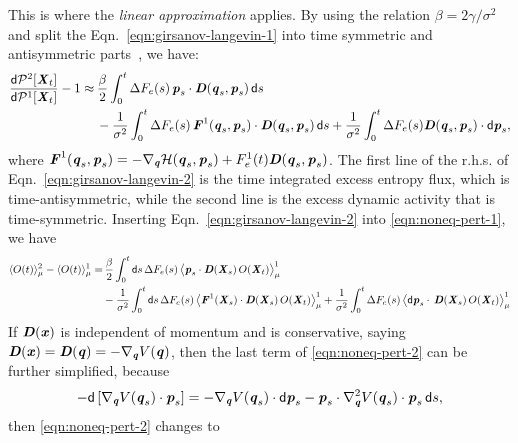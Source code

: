 \documentclass[aip,jcp,a4paper,reprint,onecolumn]{revtex4-1}
\newcommand{\vect}[1]{\textbf{\textit{#1}}}
\newcommand{\dd}{\textsf{d}}
\newcommand{\mh}{\mathcal H}
\begin{document}
This is where the \emph{linear approximation} applies.
By using the relation $\beta = 2\gamma / \sigma^2$ and split the
Eqn.~\eqref{eqn:girsanov-langevin-1} into time symmetric and
antisymmetric parts~\cite{baiesi2010nonequilibrium2}, we have:
\begin{align}\nonumber
  \frac{\dd\mathcal P^2[\vect X_t]}{\dd\mathcal P^1[\vect X_t]}
  -1
  \approx& \:
  \frac\beta 2
  \int_0^t
  \Delta F_e(s)\,
  \vect p_s\cdot \vect D(\vect q_s,\vect p_s)\,
  \dd s\\  \label{eqn:girsanov-langevin-2}
  &\,-
  \frac 1{\sigma^2}
  \int_0^t
  \Delta F_e(s)\,
  \vect F^1(\vect q_s,\vect p_s)\cdot \vect D(\vect q_s,\vect p_s)\,
  \dd s  
  +
  \frac 1{\sigma^2}
  \int_0^t
  \Delta F_e(s) \vect D(\vect q_s,\vect p_s)\cdot \dd \vect p_s,
\end{align}
where $\vect F^1(\vect q_s,\vect p_s) = -\nabla_{\vect q}\mh(\vect
q_s,\vect p_s) + F_e^1(t) \vect D(\vect q_s,\vect p_s)$.  The first
line of the r.h.s. of Eqn.~\eqref{eqn:girsanov-langevin-2} is the time
integrated excess entropy flux, which is time-antisymmetric, while the
second line is the excess dynamic activity that is time-symmetric.
Inserting Eqn.~\eqref{eqn:girsanov-langevin-2} into
\eqref{eqn:noneq-pert-1}, we have
\begin{align}\nonumber
  \langle O(t)\rangle_{\mu}^{2}  -\langle O(t)\rangle_{\mu}^{1}
  =&\,
  \frac\beta 2
  \int_0^t\dd s\,
  \Delta F_e(s)\,
  \big\langle
  \vect p_s\cdot\vect D(\vect X_s)\,O(\vect X_t)
  \big\rangle_\mu^1 \\  \label{eqn:noneq-pert-2}
  &
  -
  \frac1{\sigma^2}
  \int_0^t\dd s\,
  \Delta F_e(s)\,
  \big\langle
  \vect F^1(\vect X_s)\cdot\vect D(\vect X_s)\,O(\vect X_t)
  \big\rangle_\mu^1
  +
  \frac1{\sigma^2}
  \int_0^t
  \Delta F_e(s)\,
  \big\langle
  \dd \vect p_s\cdot\,
  \vect D(\vect X_s)\,O(\vect X_t)
  \big\rangle_\mu^1  
\end{align}
If $\vect D(\vect x)$ is independent of momentum and is conservative,
saying $\vect D(\vect x) = \vect D(\vect q) = -\nabla_{\vect q}
V(\vect q)$, then the last term of \eqref{eqn:noneq-pert-2} can be
further simplified, because
\begin{align}
  -\dd\, [\nabla_{\vect q}V(\vect q_s)\cdot \vect p_s]
  =
  -\nabla_{\vect q}V(\vect q_s)\cdot\dd \vect p_s
  - \vect p_s\cdot\nabla^2_{\vect q}V(\vect q_s)\cdot\vect p_s\,\dd s,
\end{align}
then \eqref{eqn:noneq-pert-2} changes to
\end{document}
